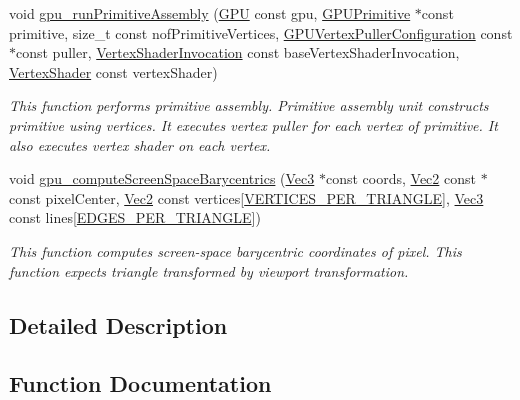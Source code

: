 \begin{DoxyCompactItemize}
void \hyperlink{group__gpu__side_ga5eb10381738a5e0426b2811820bc9483}{gpu\+\_\+run\+Primitive\+Assembly} (\hyperlink{fwd_8h_a06964ec111fe28721d8618b6d0d993bf}{G\+PU} const gpu, \hyperlink{structGPUPrimitive}{G\+P\+U\+Primitive} $\ast$const primitive, size\+\_\+t const nof\+Primitive\+Vertices, \hyperlink{structGPUVertexPullerConfiguration}{G\+P\+U\+Vertex\+Puller\+Configuration} const $\ast$const puller, \hyperlink{fwd_8h_a3a23f024b4270ea7139910001f477346}{Vertex\+Shader\+Invocation} const base\+Vertex\+Shader\+Invocation, \hyperlink{fwd_8h_a06caf90c4f22dc1c99aafd8f4b417512}{Vertex\+Shader} const vertex\+Shader)
\begin{DoxyCompactList}\small\item\em This function performs primitive assembly. Primitive assembly unit constructs primitive using vertices. It executes vertex puller for each vertex of primitive. It also executes vertex shader on each vertex. \end{DoxyCompactList}\item 
void \hyperlink{group__gpu__side_gad1769dca11910a684a6ddaad188f3e3d}{gpu\+\_\+compute\+Screen\+Space\+Barycentrics} (\hyperlink{structVec3}{Vec3} $\ast$const coords, \hyperlink{structVec2}{Vec2} const $\ast$const pixel\+Center, \hyperlink{structVec2}{Vec2} const vertices\mbox{[}\hyperlink{fwd_8h_a67df0e09b776eea53360bcc8f4a82ac9}{V\+E\+R\+T\+I\+C\+E\+S\+\_\+\+P\+E\+R\+\_\+\+T\+R\+I\+A\+N\+G\+LE}\mbox{]}, \hyperlink{structVec3}{Vec3} const lines\mbox{[}\hyperlink{fwd_8h_a9f5bff3a2ab411701ed6262d5eb96c39}{E\+D\+G\+E\+S\+\_\+\+P\+E\+R\+\_\+\+T\+R\+I\+A\+N\+G\+LE}\mbox{]})
\begin{DoxyCompactList}\small\item\em This function computes screen-\/space barycentric coordinates of pixel. This function expects triangle transformed by viewport transformation. \end{DoxyCompactList}\end{DoxyCompactItemize}


\subsection{Detailed Description}


\subsection{Function Documentation}
